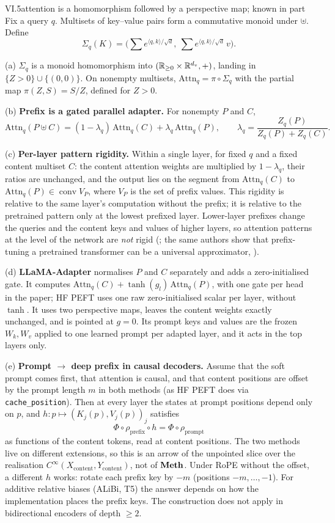 \begin{theorem}{VI.5}{attention is a homomorphism followed by a perspective map; known in part}
Fix a query $q$. Multisets of key--value pairs form a commutative monoid under $\uplus$. Define
\[\Sigma_q(K)=\Big(\sum e^{\langle q,k\rangle/\sqrt d},\ \sum e^{\langle q,k\rangle/\sqrt d}\,v\Big).\]

(a) $\Sigma_q$ is a monoid homomorphism into $(\mathbb{R}_{\ge0}\times\mathbb{R}^{d_v},+)$, landing in $\{Z>0\}\cup\{(0,0)\}$. On
nonempty multisets, $\mathrm{Attn}_q=\pi\circ\Sigma_q$ with the partial map $\pi(Z,S)=S/Z$, defined for $Z>0$.

(b) \textbf{Prefix is a gated parallel adapter.} For nonempty $P$ and $C$,
\[\mathrm{Attn}_q(P\uplus C)=(1-\lambda_q)\,\mathrm{Attn}_q(C)+\lambda_q\,\mathrm{Attn}_q(P),\qquad
\lambda_q=\frac{Z_q(P)}{Z_q(P)+Z_q(C)}.\]

(c) \textbf{Per-layer pattern rigidity.} Within a single layer, for fixed $q$ and a fixed content multiset $C$: the
content attention weights are multiplied by $1-\lambda_q$, their ratios are unchanged, and the output lies on the segment
from $\mathrm{Attn}_q(C)$ to $\mathrm{Attn}_q(P)\in\operatorname{conv}V_P$, where $V_P$ is the set of prefix values. This
rigidity is relative to the same layer's computation without the prefix; it is relative to the pretrained pattern only at
the lowest prefixed layer. Lower-layer prefixes change the queries and the content keys and values of higher layers, so
attention patterns at the level of the network are \emph{not} rigid (\citealp[§6]{petrov2023prompting}; the same authors
show that prefix-tuning a pretrained transformer can be a universal approximator, \citealp{petrov2024prompting}).

(d) \textbf{LLaMA-Adapter} normalises $P$ and $C$ separately and adds a zero-initialised gate. It computes
$\mathrm{Attn}_q(C)+\tanh(g_l)\,\mathrm{Attn}_q(P)$, with one gate per head in the paper; HF PEFT uses one raw
zero-initialised scalar per layer, without $\tanh$. It uses two perspective maps, leaves the content weights exactly
unchanged, and is pointed at $g=0$. Its prompt keys and values are the frozen $W_k,W_v$ applied to one learned prompt per
adapted layer, and it acts in the top layers only.

(e) \textbf{Prompt $\to$ deep prefix in causal decoders.} Assume that the soft prompt comes first, that attention is
causal, and that content positions are offset by the prompt length $m$ in both methods (as HF PEFT does via
\texttt{cache\_position}). Then at every layer the states at prompt positions depend only on $p$, and
$h:p\mapsto(K_j(p),V_j(p))_j$ satisfies
\[\Phi\circ\rho_{\mathrm{prefix}}\circ h=\Phi\circ\rho_{\mathrm{prompt}}\]
as functions of the content tokens, read at content positions. The two methods live on different extensions, so this is
an arrow of the unpointed slice over the realisation $C^\infty(X_{\mathrm{content}},Y_{\mathrm{content}})$, not of
$\mathbf{Meth}$. Under RoPE without the offset, a different $h$ works: rotate each prefix key by $-m$ (positions
$-m,\dots,-1$). For additive relative biases (ALiBi, T5) the answer depends on how the implementation places the prefix
keys. The construction does not apply in bidirectional encoders of depth $\ge2$.


\end{theorem}

